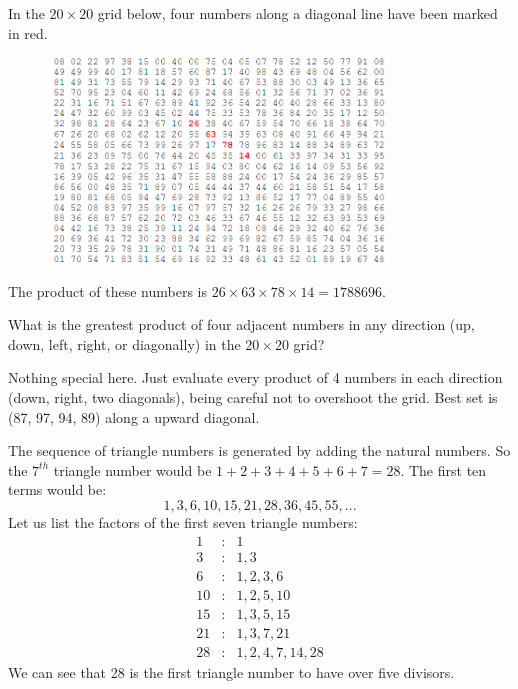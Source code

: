 In the $20\times20$ grid below, four numbers along a diagonal line have been marked in red.
\begin{center}
\begin{figure}[h]
\centering
\includegraphics[width = 0.8\textwidth]{./images/p_011.png}
\end{figure}
\end{center}
\vspace{-1cm}
The product of these numbers is $26 \times 63 \times 78 \times 14 = 1788696.$

What is the greatest product of four adjacent numbers in any direction (up, down, left, right, or diagonally) in the $20\times20$ grid?

Nothing special here.  Just evaluate every product of 4 numbers in each direction (down, right, two diagonals), being careful
not to overshoot the grid.  Best set is (87, 97, 94, 89) along a upward diagonal.




The sequence of triangle numbers is generated by adding the natural numbers. So the $7^{th}$ triangle number would be
$1 + 2 + 3 + 4 + 5 + 6 + 7 = 28$. The first ten terms would be:
$$1, 3, 6, 10, 15, 21, 28, 36, 45, 55, ...$$
Let us list the factors of the first seven triangle numbers:
\begin{eqnarray*}
     1&: &1        \\
     3&: &1,3      \\
     6&: &1,2,3,6  \\
    10&: &1,2,5,10 \\
    15&: &1,3,5,15 \\
    21&: &1,3,7,21 \\
    28&: &1,2,4,7,14,28
\end{eqnarray*}
We can see that 28 is the first triangle number to have over five divisors.

